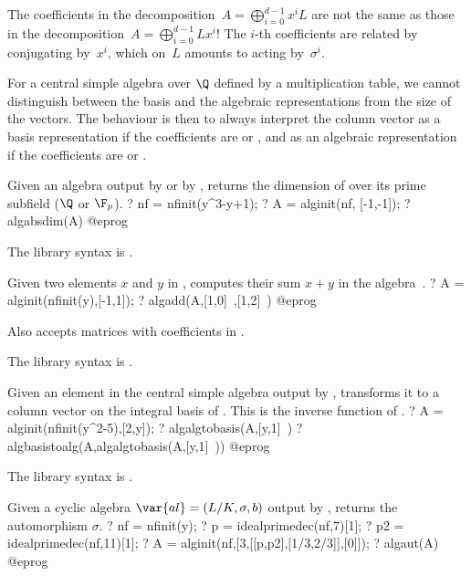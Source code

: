  The coefficients in the decomposition~$A =
\bigoplus_{i=0}^{d-1}x^iL$ are not the same as those in the decomposition~$A
= \bigoplus_{i=0}^{d-1}Lx^i$! The $i$-th coefficients are related by
conjugating by~$x^i$, which on~$L$ amounts to acting by~$\sigma^i$.

 For a central simple algebra over $\Q$ defined by a
multiplication table, we cannot distinguish between the basis and the algebraic
representations from the size of the vectors. The behaviour is then to always
interpret the column vector as a basis representation if the coefficients are
 or , and as an algebraic representation if the coefficients
are  or .


\label{se:algabsdim}
Given an algebra  output by  or by
, returns the dimension of  over its prime subfield
($\Q$ or $\F_p$).
\bprog
? nf = nfinit(y^3-y+1);
? A = alginit(nf, [-1,-1]);
? algabsdim(A)
@eprog

The library syntax is .

\label{se:algadd}
Given two elements $x$ and $y$ in , computes their sum $x+y$ in
the algebra~.
\bprog
? A = alginit(nfinit(y),[-1,1]);
? algadd(A,[1,0]~,[1,2]~)
@eprog

Also accepts matrices with coefficients in .

The library syntax is .

\label{se:algalgtobasis}
Given an element  in the central simple algebra  output
by , transforms it to a column vector on the integral basis of
. This is the inverse function of .
\bprog
? A = alginit(nfinit(y^2-5),[2,y]);
? algalgtobasis(A,[y,1]~)
? algbasistoalg(A,algalgtobasis(A,[y,1]~))
@eprog

The library syntax is .

\label{se:algaut}
Given a cyclic algebra $\var{al} = (L/K,\sigma,b)$ output by
, returns the automorphism $\sigma$.
\bprog
? nf = nfinit(y);
? p = idealprimedec(nf,7)[1];
? p2 = idealprimedec(nf,11)[1];
? A = alginit(nf,[3,[[p,p2],[1/3,2/3]],[0]]);
? algaut(A)
@eprog

